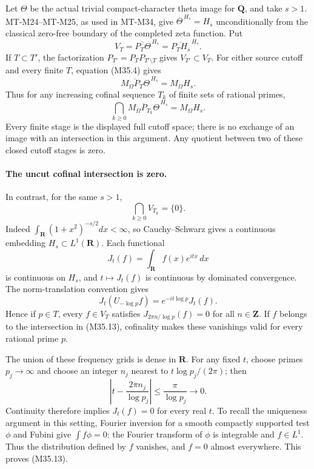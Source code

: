 Let $\Theta$ be the actual trivial compact-character
theta image for $\mathbf Q$, and take $s>1$.
MT-M24--MT-M25, as used in MT-M34, give
$\overline\Theta^{\,H_s}=H_s$ unconditionally from the
classical zero-free boundary of the completed zeta function.
Put
\[
 V_T=\overline{P_T\Theta}^{\,H_s}
                 =\overline{P_TH_s}^{\,H_s}.
 \tag{M35.10}
\]
If $T\subset T'$, the factorization
$P_{T'}=P_TP_{T'\setminus T}$ gives $V_{T'}\subset V_T$.
For either source cutoff and every finite $T$, equation
(M35.4) gives
\[
                  \overline{M_\Omega P_T\Theta}^{\,H_s}
                                  =M_\Omega H_s.
 \tag{M35.11}
\]
Thus for any increasing cofinal sequence $T_k$ of finite
sets of rational primes,
\[
 \bigcap_{k\ge0}
       \overline{M_\Omega P_{T_k}\Theta}^{\,H_s}
                                   =M_\Omega H_s.
 \tag{M35.12}
\]
Every finite stage is the displayed full cutoff space;
there is no exchange of an image with an intersection
in this argument.  Any quotient between two of these
closed cutoff stages is zero.

\paragraph{The uncut cofinal intersection is zero.}
In contrast, for the same $s>1$,
\[
                         \bigcap_{k\ge0}V_{T_k}=\{0\}.
 \tag{M35.13}
\]
Indeed $\int_{\mathbf R}(1+x^2)^{-s/2}dx<\infty$,
so Cauchy--Schwarz gives a continuous embedding
$H_s\subset L^1(\mathbf R)$.  Each functional
\[
                  J_t(f)=\int_{\mathbf R}f(x)e^{itx}\,dx
 \tag{M35.14}
\]
is continuous on $H_s$, and $t\mapsto J_t(f)$ is
continuous by dominated convergence.  The norm-translation
convention gives
\[
       J_t(U_{-\log p}f)=e^{-it\log p}J_t(f).
 \tag{M35.15}
\]
Hence if $p\in T$, every $f\in V_T$ satisfies
$J_{2\pi n/\log p}(f)=0$ for all $n\in\mathbf Z$.
If $f$ belongs to the intersection in (M35.13), cofinality
makes these vanishings valid for every rational prime $p$.

The union of these frequency grids is dense in
$\mathbf R$.  For any fixed $t$, choose primes
$p_j\to\infty$ and choose an integer $n_j$ nearest to
$t\log p_j/(2\pi)$; then
\[
       \left|t-\frac{2\pi n_j}{\log p_j}\right|
                                  \le\frac\pi{\log p_j}\longrightarrow0.
 \tag{M35.16}
\]
Continuity therefore implies $J_t(f)=0$ for every real
$t$.  To recall the uniqueness argument in this setting,
Fourier inversion for a smooth compactly supported test
$\phi$ and Fubini give $\int f\phi=0$: the Fourier
transform of $\phi$ is integrable and $f\in L^1$.
Thus the distribution defined by $f$ vanishes, and
$f=0$ almost everywhere.  This proves (M35.13).

